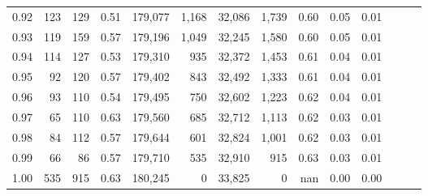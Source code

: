 \begin{tabular}{rrrrrrrrrrrrrr}
0.92 &    123 &  129 &  0.51 &  179,077 &    1,168 &  32,086 &   1,739 &  0.60 &  0.05 &      0.01 \\
0.93 &    119 &  159 &  0.57 &  179,196 &    1,049 &  32,245 &   1,580 &  0.60 &  0.05 &      0.01 \\
0.94 &    114 &  127 &  0.53 &  179,310 &      935 &  32,372 &   1,453 &  0.61 &  0.04 &      0.01 \\
0.95 &     92 &  120 &  0.57 &  179,402 &      843 &  32,492 &   1,333 &  0.61 &  0.04 &      0.01 \\
0.96 &     93 &  110 &  0.54 &  179,495 &      750 &  32,602 &   1,223 &  0.62 &  0.04 &      0.01 \\
0.97 &     65 &  110 &  0.63 &  179,560 &      685 &  32,712 &   1,113 &  0.62 &  0.03 &      0.01 \\
0.98 &     84 &  112 &  0.57 &  179,644 &      601 &  32,824 &   1,001 &  0.62 &  0.03 &      0.01 \\
0.99 &     66 &   86 &  0.57 &  179,710 &      535 &  32,910 &     915 &  0.63 &  0.03 &      0.01 \\
1.00 &    535 &  915 &  0.63 &  180,245 &        0 &  33,825 &       0 &   nan &  0.00 &      0.00 \\
\bottomrule
\end{tabular}
